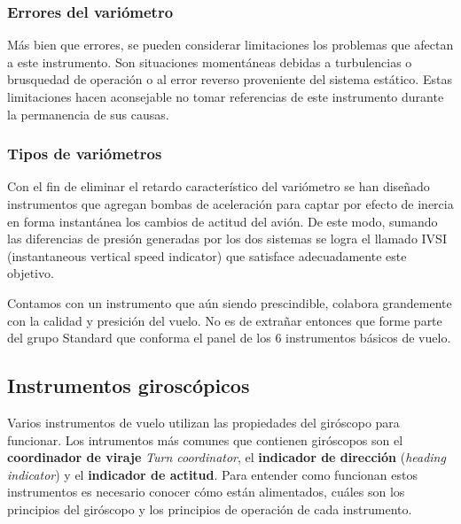 \documentclass{article}
\begin{document}
\subsubsection*{Errores del variómetro}

Más bien que errores, se pueden considerar limitaciones los problemas que afectan a este instrumento. Son situaciones momentáneas debidas a turbulencias o brusquedad de operación o al error reverso proveniente del sistema estático. Estas limitaciones hacen aconsejable no tomar referencias de este instrumento durante la permanencia de sus causas.

\subsubsection*{Tipos de variómetros}
Con el fin de eliminar el retardo característico del variómetro se han diseñado instrumentos que agregan bombas de aceleración para captar por efecto de inercia en forma instantánea los cambios de actitud del avión. De este modo, sumando las diferencias de presión generadas por los dos sistemas se logra el llamado IVSI (instantaneous vertical speed indicator) que satisface adecuadamente este objetivo.

Contamos con un instrumento que aún siendo prescindible, colabora grandemente con la calidad y presición del vuelo. No es de extrañar entonces que forme parte del grupo Standard que conforma el panel de los 6 instrumentos básicos de vuelo.
\pagebreak
\subsection{Instrumentos giroscópicos}
Varios instrumentos de vuelo utilizan las propiedades del giróscopo para funcionar. Los intrumentos más comunes que contienen giróscopos son el \textbf{coordinador de viraje} \emph{Turn coordinator}, el \textbf{indicador de dirección} (\emph{heading indicator}) y el \textbf{indicador de actitud}. Para entender como funcionan estos instrumentos es necesario conocer cómo están alimentados, cuáles son los principios del giróscopo y los principios de operación de cada instrumento.
\end{document}
